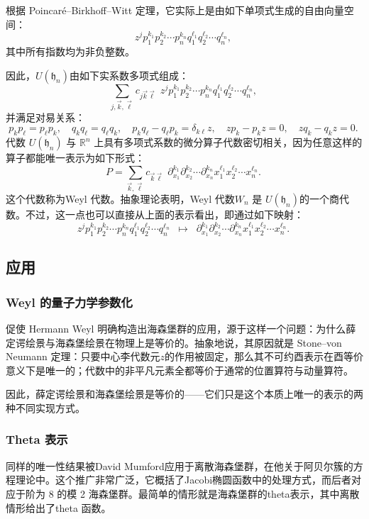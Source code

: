 根据 Poincaré–Birkhoff–Witt 定理，它实际上是由如下单项式生成的自由向量空间：
$$
z^{j} p_{1}^{k_{1}} p_{2}^{k_{2}} \cdots p_{n}^{k_{n}} q_{1}^{\ell_{1}} q_{2}^{\ell_{2}} \cdots q_{n}^{\ell_{n}},~
$$
其中所有指数均为非负整数。

因此，$U(\mathfrak{h}_{n})$由如下实系数多项式组成：
$$
\sum_{j, \vec{k}, \vec{\ell}} c_{j \vec{k} \vec{\ell}} \,\, z^{j} p_{1}^{k_{1}} p_{2}^{k_{2}} \cdots p_{n}^{k_{n}} q_{1}^{\ell_{1}} q_{2}^{\ell_{2}} \cdots q_{n}^{\ell_{n}},~
$$
并满足对易关系：
$$
p_{k} p_{\ell} = p_{\ell} p_{k}, \quad 
q_{k} q_{\ell} = q_{\ell} q_{k}, \quad 
p_{k} q_{\ell} - q_{\ell} p_{k} = \delta_{k\ell} z, \quad 
zp_{k} - p_{k}z = 0, \quad 
zq_{k} - q_{k}z = 0.~
$$
代数 $U(\mathfrak{h}_{n})$ 与 $\mathbb{R}^{n}$ 上具有多项式系数的微分算子代数密切相关，因为任意这样的算子都能唯一表示为如下形式：
$$
P = \sum_{\vec{k}, \vec{\ell}} c_{\vec{k} \vec{\ell}} \,\, 
\partial_{x_{1}}^{k_{1}} \partial_{x_{2}}^{k_{2}} \cdots \partial_{x_{n}}^{k_{n}} 
x_{1}^{\ell_{1}} x_{2}^{\ell_{2}} \cdots x_{n}^{\ell_{n}}.~
$$
这个代数称为Weyl 代数。抽象理论表明，Weyl 代数$W_{n}$ 是 $U(\mathfrak{h}_{n})$的一个商代数。不过，这一点也可以直接从上面的表示看出，即通过如下映射：
$$
z^{j} p_{1}^{k_{1}} p_{2}^{k_{2}} \cdots p_{n}^{k_{n}} q_{1}^{\ell_{1}} q_{2}^{\ell_{2}} \cdots q_{n}^{\ell_{n}}
\;\;\mapsto\;\;
\partial_{x_{1}}^{k_{1}} \partial_{x_{2}}^{k_{2}} \cdots \partial_{x_{n}}^{k_{n}}
x_{1}^{\ell_{1}} x_{2}^{\ell_{2}} \cdots x_{n}^{\ell_{n}}.~
$$
\subsection{应用}
\subsubsection{Weyl 的量子力学参数化}
促使 Hermann Weyl 明确构造出海森堡群的应用，源于这样一个问题：为什么薛定谔绘景与海森堡绘景在物理上是等价的。抽象地说，其原因就是 Stone–von Neumann 定理：只要中心李代数元$z$的作用被固定，那么其不可约酉表示在酉等价意义下是唯一的；代数中的非平凡元素全都等价于通常的位置算符与动量算符。

因此，薛定谔绘景和海森堡绘景是等价的——它们只是这个本质上唯一的表示的两种不同实现方式。
\subsubsection{Theta 表示}
同样的唯一性结果被David Mumford应用于离散海森堡群，在他关于阿贝尔簇的方程理论中。这个推广非常广泛，它概括了Jacobi椭圆函数中的处理方式，而后者对应于阶为 8 的模 2 海森堡群。最简单的情形就是海森堡群的theta表示，其中离散情形给出了theta 函数。
